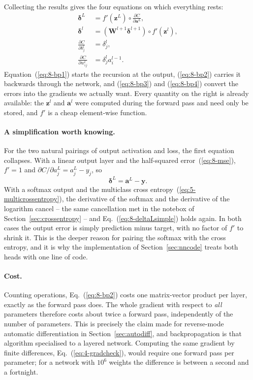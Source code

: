 Collecting the results gives the four equations on which everything rests:
\begin{align}
  \bm{\delta}^{L} &= f'\!\left(\bm{z}^{L}\right)\circ
    \frac{\partial C}{\partial\bm{a}^{L}},
  \label{eq:8-bp1}\\[4pt]
  \bm{\delta}^{l} &= \left(\bm{W}^{l+1}\bm{\delta}^{l+1}\right)
    \circ f'\!\left(\bm{z}^{l}\right),
  \label{eq:8-bp2}\\[4pt]
  \frac{\partial C}{\partial b_j^{l}} &= \delta_j^{l},
  \label{eq:8-bp3}\\[4pt]
  \frac{\partial C}{\partial w_{ij}^{l}} &= \delta_j^{l}a_i^{l-1}.
  \label{eq:8-bp4}
\end{align}
Equation~(\ref{eq:8-bp1}) starts the recursion at the output, (\ref{eq:8-bp2})
carries it backwards through the network, and (\ref{eq:8-bp3}) and
(\ref{eq:8-bp4}) convert the errors into the gradients we actually want.  Every
quantity on the right is already available: the $\bm{z}^{l}$ and $\bm{a}^{l}$
were computed during the forward pass and need only be stored, and $f'$ is a
cheap element-wise function.

\paragraph{A simplification worth knowing.}
For the two natural pairings of output activation and loss, the first equation
collapses.  With a linear output layer and the half-squared
error~(\ref{eq:8-mse}), $f'=1$ and $\partial C/\partial a_j^{L}=a_j^{L}-y_j$,
so
\begin{equation}
  \bm{\delta}^{L} = \bm{a}^{L}-\bm{y}.
  \label{eq:8-deltaLsimple}
\end{equation}
With a softmax output and the multiclass cross
entropy~(\ref{eq:5-multicrossentropy}), the derivative of the softmax and the
derivative of the logarithm cancel -- the same cancellation met in the notebox
of Section~\ref{sec:crossentropy} -- and Eq.~(\ref{eq:8-deltaLsimple}) holds
again.  In both cases the output error is simply prediction minus target, with
no factor of $f'$ to shrink it.  This is the deeper reason for pairing the
softmax with the cross entropy, and it is why the implementation of
Section~\ref{sec:nncode} treats both heads with one line of code.

\paragraph{Cost.}
Counting operations, Eq.~(\ref{eq:8-bp2}) costs one matrix-vector product per
layer, exactly as the forward pass does.  The whole gradient with respect to
\emph{all} parameters therefore costs about twice a forward pass, independently
of the number of parameters.  This is precisely the claim made for reverse-mode
automatic differentiation in Section~\ref{sec:autodiff}, and backpropagation is
that algorithm specialised to a layered network.  Computing the same gradient
by finite differences, Eq.~(\ref{eq:4-gradcheck}), would require one forward
pass per parameter; for a network with $10^{6}$ weights the difference is
between a second and a fortnight.

